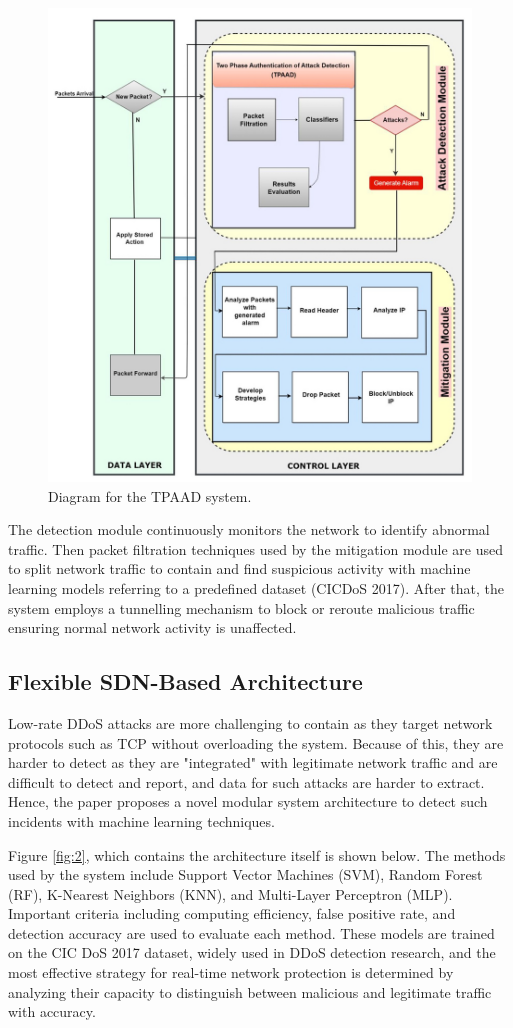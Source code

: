 \documentclass[a4paper, 12pt]{article}
\begin{document}
\begin{figure}[H]
    \centering
    \includegraphics[width=0.7\linewidth]{IMG_0249.jpeg}
    \caption{Diagram for the TPAAD system. \protect{}}
    \label{fig:1}
\end{figure}

The detection module continuously monitors the network to identify abnormal traffic. Then packet filtration techniques used by the mitigation module are used to split network traffic to contain and find suspicious activity with machine learning models referring to a predefined dataset (CICDoS 2017). After that, the system employs a tunnelling mechanism to block or reroute malicious traffic ensuring normal network activity is unaffected. 


\subsection{Flexible SDN-Based Architecture}
Low-rate DDoS attacks are more challenging to contain as they target network protocols such as TCP without overloading the system. Because of this, they are harder to detect as they are "integrated" with legitimate network traffic and are difficult to detect and report, and data for such attacks are harder to extract. Hence, the paper proposes a novel modular system architecture to detect such incidents with machine learning techniques. 

Figure \ref{fig:2}, which contains the architecture itself is shown below. The methods used by the system include Support Vector Machines (SVM), Random Forest (RF), K-Nearest Neighbors (KNN), and Multi-Layer Perceptron (MLP).  Important criteria including computing efficiency, false positive rate, and detection accuracy are used to evaluate each method. These models are trained on the CIC DoS 2017 dataset, widely used in DDoS detection research, and the most effective strategy for real-time network protection is determined by analyzing their capacity to distinguish between malicious and legitimate traffic with accuracy. 
\end{document}
